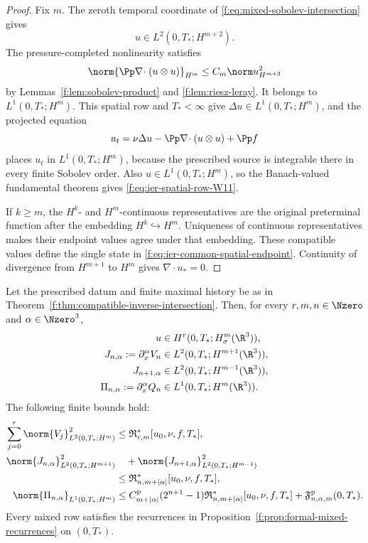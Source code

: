 \begin{proof}
Fix \(m\).  The zeroth temporal coordinate of
\eqref{f:eq:mixed-sobolev-intersection} gives
\[
 u\in L^2(0,T_*;H^{m+2}).
\]
The pressure-completed nonlinearity satisfies
\[
 \norm{\Pp\nabla\!\cdot(u\otimes u)}_{H^m}
 \le C_m\norm u_{H^{m+2}}^2
\]
by Lemmas~\ref{f:lem:sobolev-product} and \ref{f:lem:riesz-leray}.  It belongs
to \(L^1(0,T_*;H^m)\).  This spatial row and \(T_*<\infty\) give
 \(\Delta u\in L^1(0,T_*;H^m)\), and the projected equation
\[
 u_t=\nu\Delta u-\Pp\nabla\!\cdot(u\otimes u)+\Pp f
\]
places \(u_t\) in \(L^1(0,T_*;H^m)\), because the prescribed source is
integrable there in every finite Sobolev order.  Also
\(u\in L^1(0,T_*;H^m)\), so the Banach-valued fundamental theorem gives
\eqref{f:eq:ier-spatial-row-W11}.

If \(k\ge m\), the \(H^k\)- and \(H^m\)-continuous representatives are
the original preterminal function after the embedding \(H^k\hookrightarrow
H^m\).  Uniqueness of continuous representatives makes their endpoint
values agree under that embedding.  These compatible values define the
single state in \eqref{f:eq:ier-common-spatial-endpoint}.  Continuity of
divergence from \(H^{m+1}\) to \(H^m\) gives \(\nabla\cdot u_*=0\).
\end{proof}

\begin{corollary}
\label{f:cor:ier-whole-terminal-mixed-jet}
Let the prescribed datum and finite maximal history be as in
Theorem~\ref{f:thm:compatible-inverse-intersection}.  Then, for every
\(r,m,n\in\Nzero\) and \(\alpha\in\Nzero^3\),
\begin{align}
 u&\in H^r(0,T_*;H^m_\sigma(\R^3)),
 \label{f:eq:ier-whole-terminal-bochner}\\
 J_{n,\alpha}:=\partial_x^\alpha V_n
 &\in L^2(0,T_*;H^{m+1}(\R^3)),
 \label{f:eq:ier-whole-terminal-mixed-upper}\\
 J_{n+1,\alpha}
 &\in L^2(0,T_*;H^{m-1}(\R^3)),
 \label{f:eq:ier-whole-terminal-mixed-lower}\\
 \Pi_{n,\alpha}:=\partial_x^\alpha Q_n
 &\in L^1(0,T_*;H^m(\R^3)).
 \label{f:eq:ier-whole-terminal-mixed-pressure}
\end{align}
The following finite bounds hold:
\begin{align}
 \sum_{j=0}^{r}\norm{V_j}_{L^2(0,T_*;H^m)}^2
 &\le\mathfrak R_{r,m}^*[u_0,\nu,f,T_*],
 \label{f:eq:ier-finite-bochner-bound}\\
 \norm{J_{n,\alpha}}_{L^2(0,T_*;H^{m+1})}^2
 &\quad+\norm{J_{n+1,\alpha}}_{L^2(0,T_*;H^{m-1})}^2
 \notag\\
 &\le\mathfrak R_{n,m+|\alpha|}^*[u_0,\nu,f,T_*],
 \label{f:eq:ier-finite-mixed-bound}\\
 \norm{\Pi_{n,\alpha}}_{L^1(0,T_*;H^m)}
 &\le C_{m+|\alpha|}^{\rm p}(2^{n+1}-1)
 \mathfrak R_{n,m+|\alpha|}^*[u_0,\nu,f,T_*]
 +\mathfrak F^{\rm p}_{n,\alpha,m}(0,T_*).
 \label{f:eq:ier-finite-mixed-pressure-bound}
\end{align}
Every mixed row satisfies the recurrences in
Proposition~\ref{f:prop:formal-mixed-recurrences} on \((0,T_*)\).
\end{corollary}

